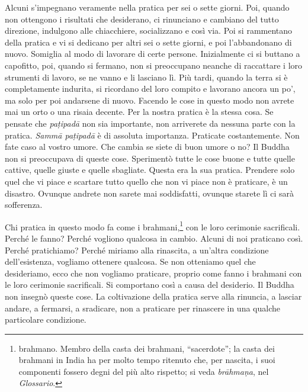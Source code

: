 Alcuni s'impegnano veramente nella pratica per sei o sette giorni. Poi,
quando non ottengono i risultati che desiderano, ci rinunciano e
cambiano del tutto direzione, indulgono alle chiacchiere, socializzano e
così via. Poi si rammentano della pratica e vi si dedicano per altri sei
o sette giorni, e poi l'abbandonano di nuovo. Somiglia al modo di
lavorare di certe persone. Inizialmente ci si buttano a capofitto, poi,
quando si fermano, non si preoccupano neanche di raccattare i loro
strumenti di lavoro, se ne vanno e li lasciano lì. Più tardi, quando la
terra si è completamente indurita, si ricordano del loro compito e
lavorano ancora un po', ma solo per poi andarsene di nuovo. Facendo le
cose in questo modo non avrete mai un orto o una risaia decente. Per la
nostra pratica è la stessa cosa. Se pensate che \emph{paṭipadā} non sia
importante, non arriverete da nessuna parte con la pratica. \emph{Sammā
paṭipadā} è di assoluta importanza. Praticate costantemente. Non fate
caso al vostro umore. Che cambia se siete di buon umore o no? Il Buddha
non si preoccupava di queste cose. Sperimentò tutte le cose buone e
tutte quelle cattive, quelle giuste e quelle sbagliate. Questa era la
sua pratica. Prendere solo quel che vi piace e scartare tutto quello che
non vi piace non è praticare, è un disastro. Ovunque andrete non sarete
mai soddisfatti, ovunque starete lì ci sarà sofferenza.

Chi pratica in questo modo fa come i brahmani,\footnote{brahmano. Membro
  della casta dei brahmani, ``sacerdote''; la casta dei brahmani in
  India ha per molto tempo ritenuto che, per nascita, i suoi componenti
  fossero degni del più alto rispetto; si veda \emph{brāhmaṇa}, nel
  \emph{Glossario}.} con le loro cerimonie sacrificali. Perché le fanno?
Perché vogliono qualcosa in cambio. Alcuni di noi praticano così. Perché
pratichiamo? Perché miriamo alla rinascita, a un'altra condizione
dell'esistenza, vogliamo ottenere qualcosa. Se non otteniamo quel che
desideriamo, ecco che non vogliamo praticare, proprio come fanno i
brahmani con le loro cerimonie sacrificali. Si comportano così a causa
del desiderio. Il Buddha non insegnò queste cose. La coltivazione della
pratica serve alla rinuncia, a lasciar andare, a fermarsi, a sradicare,
non a praticare per rinascere in una qualche particolare condizione.

